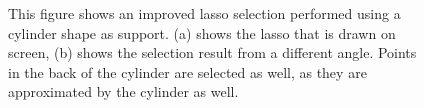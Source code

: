 \begin{figure}
\centering
{}
\caption[Example of an improved lasso selection on a cylinder]
{This figure shows an improved lasso selection performed using a cylinder shape as support. (a) shows the lasso that is drawn on screen, (b) shows the selection result from a different angle. Points in the back of the cylinder are selected as well, as they are approximated by the cylinder as well. }
\label{fig:syntheticScene_lasso}
\end{figure}


